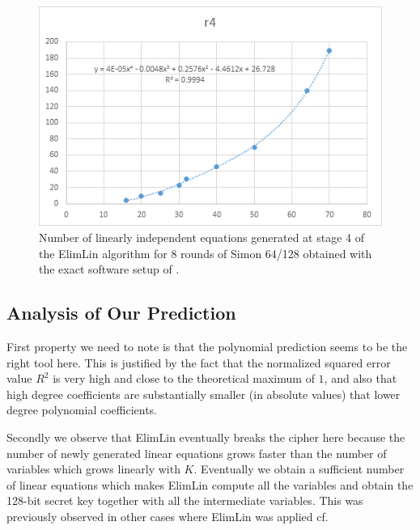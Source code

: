 \begin{figure}[!h]
	\vspace{-0.2cm}
	\centering
	\includegraphics*[width=120mm]{./pics/image011.png}
		\caption{Number of linearly independent equations generated at stage 4
			of the ElimLin algorithm
			for 8 rounds of Simon 64/128 obtained with the exact software setup
			of \cite{AlgteachElimLinLab}.}
	\label{ElimLinQuadConjExampleSimon8}
	\vspace{-0.1cm}
\end{figure}

\subsection{Analysis of Our Prediction}

First property we need to note is that the polynomial prediction seems to be the right tool here.
This is justified by the fact that the normalized squared error value $R^2$ is very high and close
to the theoretical maximum of $1$, and also
that high degree coefficients are substantially smaller
(in absolute values) that lower degree polynomial coefficients.

Secondly we observe that
ElimLin eventually breaks the cipher here because
the number of newly generated linear equations grows
faster
than the number of variables which grows linearly with $K$.
Eventually we obtain a sufficient number of linear equations which makes ElimLin
compute all the variables and obtain the 128-bit secret key together with all the intermediate variables.
%
This was previously observed in other cases where ElimLin was applied
cf. %
\cite{SlidesAlgAllteach,ToyRijSer,%
	FastAlg2,desalg} %

